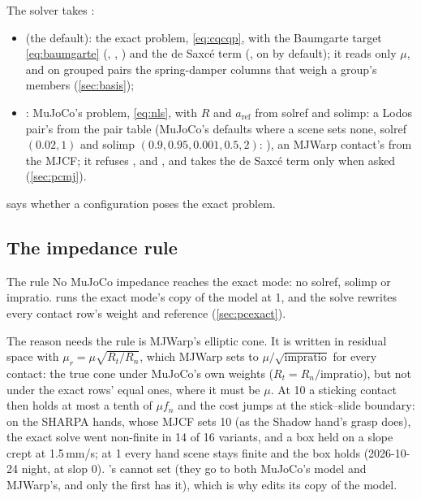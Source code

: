 The solver takes :
\begin{itemize}
\item {} (the default): the exact problem, \cref{eq:cqcqp}, with the Baumgarte target \cref{eq:baumgarte} (, , ) and the de Saxc\'e term (, on by default); it reads only $\mu$, and on grouped pairs the spring-damper columns that weigh a group's members (\cref{sec:basis});
\item {}: MuJoCo's problem, \cref{eq:nls}, with $R$ and $a_{\text{ref}}$ from solref and solimp: a Lodos pair's from the pair table (MuJoCo's defaults where a scene sets none, solref $(0.02, 1)$ and solimp $(0.9, 0.95, 0.001, 0.5, 2)$: ), an MJWarp contact's from the MJCF; it refuses ,  and , and takes the de Saxc\'e term only when asked (\cref{sec:pcmj}).
\end{itemize}
 says whether a configuration poses the exact problem.

\subsection{The impedance rule}\label{sec:impedance}

\begin{notebox}{The rule}
No MuJoCo impedance reaches the exact mode: no solref, solimp or impratio.  runs the exact mode's copy of the model at  1, and the solve rewrites every contact row's weight and reference (\cref{sec:pcexact}).
\end{notebox}

The reason  needs the rule is MJWarp's elliptic cone. It is written in residual space with $\mu_r = \mu\sqrt{R_t/R_n}$, which MJWarp sets to $\mu/\sqrt{\text{impratio}}$ for every contact: the true cone under MuJoCo's own weights ($R_t = R_n/\text{impratio}$), but not under the exact rows' equal ones, where it must be $\mu$. At  10 a sticking contact then holds at most a tenth of $\mu f_n$ and the cost jumps at the stick--slide boundary: on the SHARPA hands, whose MJCF sets  10 (as the Shadow hand's grasp does), the exact solve went non-finite in 14 of 16 variants, and a box held on a slope crept at 1.5\,mm/s; at  1 every hand scene stays finite and the box holds (2026-10-24 night, at slop 0). 's  cannot set  (they go to both MuJoCo's model and MJWarp's, and only the first has it), which is why  edits its copy of the model.

